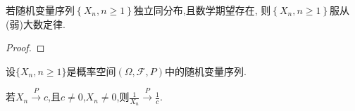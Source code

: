\documentclass[lang=cn,newtx,10pt,scheme=chinese]{../../Template/elegantbook}
\begin{document}
\begin{theorem}[Khinchin大数定律]\label{theorem:Khinchin大数定律}
    若随机变量序列$\left\{ X_n,n\ge 1 \right\}$独立同分布,且数学期望存在,
    则$\left\{ X_n,n\ge 1 \right\}$服从(弱)大数定律.
\end{theorem}
\begin{proof}
    
\end{proof}

\begin{theorem}[依概率收敛的性质]\label{theorem:依概率收敛的性质}
    设\(\{ X_n, n \geqslant 1\}\)是概率空间\((\varOmega, \mathcal{F}, P)\)中的随机变量序列.

若\(X_n \overset{P}{\rightarrow} c\),且\(c \neq 0\),\(X_n \neq 0\),则\(\frac{1}{X_n} \overset{P}{\rightarrow} \frac{1}{c}\).
\end{theorem}
\end{document}
